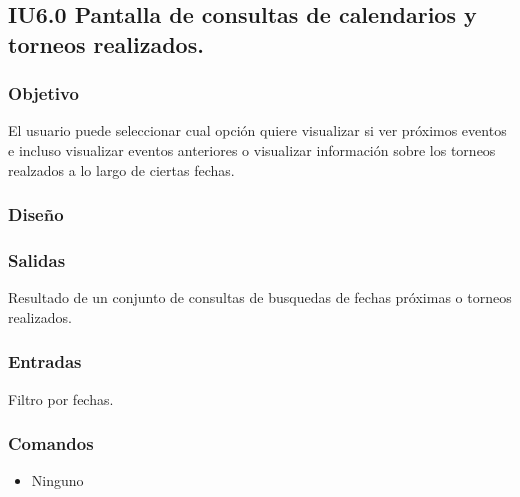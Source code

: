 
\subsection{IU6.0 Pantalla de consultas de calendarios y torneos realizados.}

\subsubsection{Objetivo}
	El usuario puede seleccionar cual opción quiere visualizar si ver próximos eventos e incluso visualizar eventos anteriores o visualizar información sobre los torneos realzados a lo largo de ciertas fechas.

\subsubsection{Diseño}


\subsubsection{Salidas}

	Resultado de un conjunto de consultas de busquedas de fechas próximas o torneos realizados.

\subsubsection{Entradas}
	Filtro por fechas.

\subsubsection{Comandos}
\begin{itemize}
	\item Ninguno
\end{itemize}


